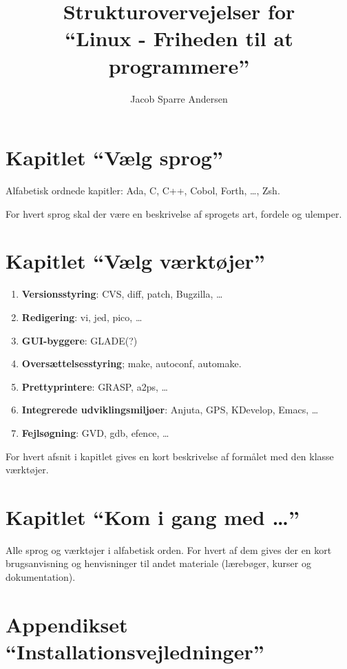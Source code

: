 \documentclass[a4paper]{article}
\title{Strukturovervejelser for \\
   ``Linux - Friheden til at programmere''}
\author{Jacob Sparre Andersen}
\begin{document}
 \maketitle
 
 \section{Kapitlet ``Vælg sprog''}

 Alfabetisk ordnede kapitler: Ada, C, C++, Cobol, Forth, \ldots, Zsh.
 
 For hvert sprog skal der være en beskrivelse af sprogets art, fordele
 og ulemper.

 \section{Kapitlet ``Vælg værktøjer''}

 \begin{enumerate}
  \item{\bf Versionsstyring}: CVS, diff, patch, Bugzilla, \ldots
  \item{\bf Redigering}: vi, jed, pico, \ldots
  \item{\bf GUI-byggere}: GLADE(?)
  \item{\bf Oversættelsesstyring}; make, autoconf, automake.
  \item{\bf Prettyprintere}: GRASP, a2ps, \ldots
  \item{\bf Integrerede udviklingsmiljøer}: Anjuta, GPS, KDevelop,
    Emacs, \ldots
  \item{\bf Fejlsøgning}: GVD, gdb, efence, \ldots
 \end{enumerate}
 
 For hvert afsnit i kapitlet gives en kort beskrivelse af formålet med
 den klasse værktøjer.

 \section{Kapitlet ``Kom i gang med \ldots''}
 
 Alle sprog og værktøjer i alfabetisk orden.  For hvert af dem gives
 der en kort brugsanvisning og henvisninger til andet materiale
 (lærebøger, kurser og dokumentation).

 \section{Appendikset ``Installationsvejledninger''}
 
\end{document}
